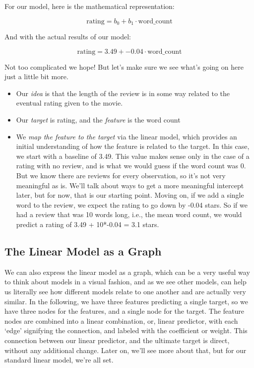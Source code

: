 \documentclass[
  letterpaper,
]{krantz}
\providecommand{\tightlist}{%
  \setlength{\itemsep}{0pt}\setlength{\parskip}{0pt}}\usepackage{longtable,booktabs,array}
\begin{document}
For our model, here is the mathematical representation:

\[
\textrm{rating} = b_0 + b_1 \cdot \textrm{word\_count}
\]

And with the actual results of our model:

\[
\textrm{rating} = 3.49 + -0.04 \cdot \textrm{word\_count}
\]

Not too complicated we hope! But let's make sure we see what's going on
here just a little bit more.

\begin{itemize}
\tightlist
\item
  Our \emph{idea} is that the length of the review is in some way
  related to the eventual rating given to the movie.
\item
  Our \emph{target} is rating, and the \emph{feature} is the word count
\item
  We \emph{map the feature to the target} via the linear model, which
  provides an initial understanding of how the feature is related to the
  target. In this case, we start with a baseline of 3.49. This value
  makes sense only in the case of a rating with no review, and is what
  we would guess if the word count was 0. But we know there are reviews
  for every observation, so it's not very meaningful as is. We'll talk
  about ways to get a more meaningful intercept later, but for now, that
  is our starting point. Moving on, if we add a single word to the
  review, we expect the rating to go down by -0.04 stars. So if we had a
  review that was 10 words long, i.e., the mean word count, we would
  predict a rating of 3.49 + 10*-0.04 = 3.1 stars.
\end{itemize}

\subsection{The Linear Model as a Graph}\label{sec-lm-graph}

We can also express the linear model as a graph, which can be a very
useful way to think about models in a visual fashion, and as we see
other models, can help us literally see how different models relate to
one another and are actually very similar. In the following, we have
three features predicting a single target, so we have three nodes for
the features, and a single node for the target. The feature nodes are
combined into a linear combination, or, linear predictor, with each
`edge' signifying the connection, and labeled with the coefficient or
weight. This connection between our linear predictor, and the ultimate
target is direct, without any additional change. Later on, we'll see
more about that, but for our standard linear model, we're all set.
\end{document}
